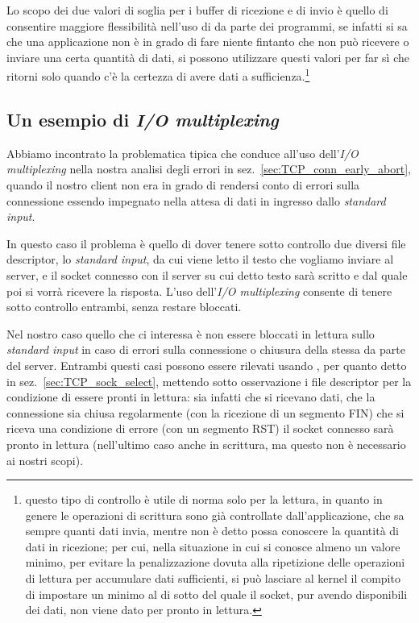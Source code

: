 Lo scopo dei due valori di soglia per i buffer di ricezione e di invio è
quello di consentire maggiore flessibilità nell'uso di  da parte
dei programmi, se infatti si sa che una applicazione non è in grado di fare
niente fintanto che non può ricevere o inviare una certa quantità di dati, si
possono utilizzare questi valori per far sì che  ritorni solo
quando c'è la certezza di avere dati a sufficienza.\footnote{questo tipo di
  controllo è utile di norma solo per la lettura, in quanto in genere le
  operazioni di scrittura sono già controllate dall'applicazione, che sa
  sempre quanti dati invia, mentre non è detto possa conoscere la quantità di
  dati in ricezione; per cui, nella situazione in cui si conosce almeno un
  valore minimo, per evitare la penalizzazione dovuta alla ripetizione delle
  operazioni di lettura per accumulare dati sufficienti, si può lasciare al
  kernel il compito di impostare un minimo al di sotto del quale il socket,
  pur avendo disponibili dei dati, non viene dato per pronto in lettura.}



\subsection{Un esempio di \textit{I/O multiplexing}}
\label{sec:TCP_multiplex_example}

Abbiamo incontrato la problematica tipica che conduce all'uso dell'\textit{I/O
  multiplexing} nella nostra analisi degli errori in
sez.~\ref{sec:TCP_conn_early_abort}, quando il nostro client non era in grado
di rendersi conto di errori sulla connessione essendo impegnato nella attesa
di dati in ingresso dallo \textit{standard input}.

In questo caso il problema è quello di dover tenere sotto controllo due
diversi file descriptor, lo \textit{standard input}, da cui viene letto il
testo che vogliamo inviare al server, e il socket connesso con il server su
cui detto testo sarà scritto e dal quale poi si vorrà ricevere la
risposta. L'uso dell'\textit{I/O multiplexing} consente di tenere sotto controllo
entrambi, senza restare bloccati.

Nel nostro caso quello che ci interessa è non essere bloccati in lettura sullo
\textit{standard input} in caso di errori sulla connessione o chiusura della
stessa da parte del server. Entrambi questi casi possono essere rilevati
usando , per quanto detto in sez.~\ref{sec:TCP_sock_select},
mettendo sotto osservazione i file descriptor per la condizione di essere
pronti in lettura: sia infatti che si ricevano dati, che la connessione sia
chiusa regolarmente (con la ricezione di un segmento FIN) che si riceva una
condizione di errore (con un segmento RST) il socket connesso sarà pronto in
lettura (nell'ultimo caso anche in scrittura, ma questo non è necessario ai
nostri scopi).

